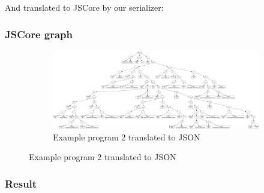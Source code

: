 And translated to JSCore by our serializer:



\subsubsection{JSCore graph}

\begin{figure}
\begin{figure}[H]
\includegraphics[width=\textwidth]{../interpreter/tests/fib.png}
\caption{Example program 2 translated to JSON}
\label{fig:fibgraph}
\end{figure}
\end{figure}

\subsubsection{Result}

